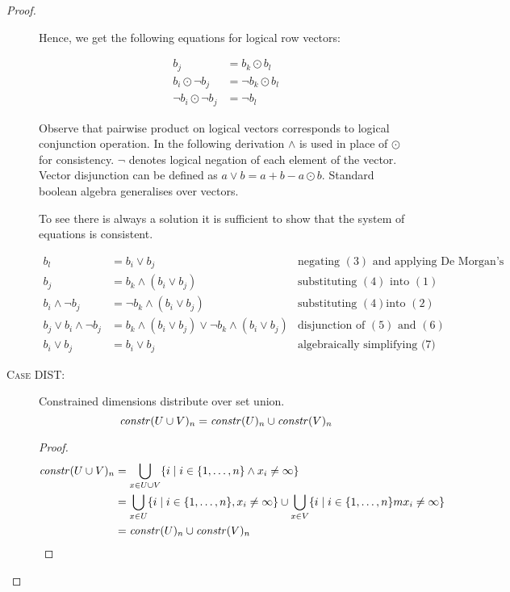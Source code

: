 \begin{proof}
\begin{description}
    Hence, we get the following equations for logical row vectors:

    \begin{align}
      b_j & = b_k \odot b_l \\
      b_i \odot \neg b_j & = \neg b_k \odot b_l \\
      \neg b_i \odot \neg b_j & = \neg b_l
    \end{align}

    Observe that pairwise product on logical vectors corresponds to logical
    conjunction operation. In the following derivation $\wedge$ is used in place
    of $\odot$ for consistency. $\neg$ denotes logical negation of each element
    of the vector. Vector disjunction can be defined as $a \vee b = a + b - a
    \odot b$. Standard boolean algebra generalises over vectors.

    To see there is always a solution it is sufficient to show that the system
    of equations is consistent.

    \begin{align}
      b_l &= b_i \vee b_j & \mbox{negating $(3)$ and applying De Morgan's law} \\
      b_j &= b_k \wedge (b_i \vee b_j) & \mbox{substituting $(4)$ into $(1)$} \\
      b_i \wedge \neg b_j &= \neg b_k \wedge (b_i \vee b_j) & \mbox{substituting $(4)$
        into $(2)$} \\
      b_j \vee b_i \wedge \neg b_j &= b_k \wedge (b_i \vee b_j) \vee \neg b_k \wedge (b_i \vee b_j) & \mbox{disjunction of $(5)$ and $(6)$} \\
      b_i \vee b_j &= b_i \vee b_j & \mbox{algebraically simplifying (7)} \nonumber
    \end{align}



  \item[\textsc{Case DIST}:]
    \begin{lemma}\label{lem:effdims}
      Constrained dimensions distribute over set union.
      $$\mathit{constr}(U \cup V)_{n} = \mathit{constr}(U)_{n} \cup \mathit{constr}(V)_{n}$$
    \end{lemma}

    \begin{proof}
      \begin{align*}
        \mathit{constr}(U \cup V)_{n} &= \bigcup_{x \in U \cup V} \{ i \; | \; i \in \{1, \ldots, n\} \wedge x_i \neq \infty \} \\
        &= \bigcup_{x \in U} \{ i \; | \; i \in \{1, \ldots, n\}, x_i \neq \infty \} \cup
           \bigcup_{x \in V} \{ i \; | \; i \in \{1, \ldots, n\}m x_i \neq \infty \} \\
        &= \mathit{constr}(U)_{n} \cup \mathit{constr}(V)_{n} \\
      \end{align*}
    \end{proof}


\end{description}
\end{proof}
